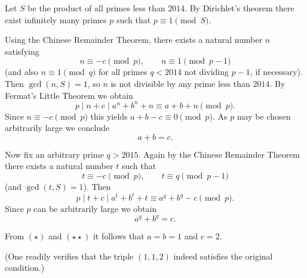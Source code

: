 Let $S$ be the product of all primes less than $2014$. By Dirichlet’s theorem there exist infinitely many primes $p$ such that $p \equiv 1 \pmod{S}$.

Using the Chinese Remainder Theorem, there exists a natural number $n$ satisfying
\[
n \equiv -c \pmod{p}, \qquad n \equiv 1 \pmod{p-1}
\]
(and also $n \equiv 1 \pmod{q}$ for all primes $q < 2014$ not dividing $p-1$, if necessary). Then $\gcd(n,S)=1$, so $n$ is not divisible by any prime less than $2014$. By Fermat’s Little Theorem we obtain
\[
p \mid n+c \mid a^n + b^n + n \equiv a + b + n \pmod{p}.
\]
Since $n \equiv -c \pmod{p}$ this yields $a + b - c \equiv 0 \pmod{p}$. As $p$ may be chosen arbitrarily large we conclude
\[
a + b = c. \tag{$\star$}
\]

Now fix an arbitrary prime $q > 2015$. Again by the Chinese Remainder Theorem there exists a natural number $t$ such that
\[
t \equiv -c \pmod{p}, \qquad t \equiv q \pmod{p-1}
\]
(and $\gcd(t,S)=1$). Then
\[
p \mid t+c \mid a^t + b^t + t \equiv a^q + b^q - c \pmod{p}.
\]
Since $p$ can be arbitrarily large we obtain
\[
a^q + b^q = c. \tag{$\star\star$}
\]

From $(\star)$ and $(\star\star)$ it follows that $a = b = 1$ and $c = 2$.

(One readily verifies that the triple $(1,1,2)$ indeed satisfies the original condition.)
